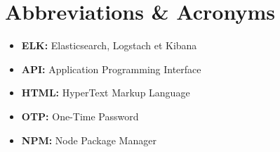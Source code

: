 \chapter*{Abbreviations \& Acronyms}

\begin{itemize}
	\item \textbf{ELK:}  Elasticsearch, Logstach et Kibana
	\item \textbf{API:}  Application Programming Interface
	\item \textbf{HTML:}  HyperText Markup Language
	\item \textbf{OTP:} One-Time Password
	\item \textbf{NPM:} Node Package Manager
\end{itemize}